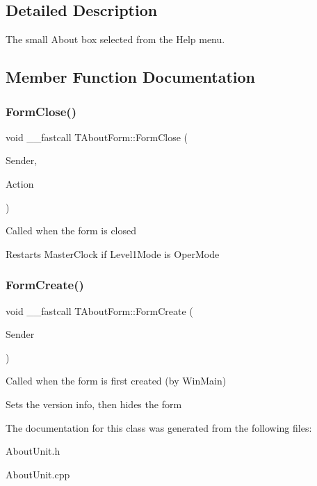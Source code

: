 \subsection{Detailed Description}
The small \textquotesingle{}About\textquotesingle{} box selected from the Help menu. 

\subsection{Member Function Documentation}
\mbox{\label{class_t_about_form_acddaba886282fa0cb6aa0ee77520fb05}} 
\subsubsection{\texorpdfstring{Form\+Close()}{FormClose()}}
{\footnotesize\ttfamily void \+\_\+\+\_\+fastcall T\+About\+Form\+::\+Form\+Close (\begin{DoxyParamCaption}\item[{T\+Object $\ast$}]{Sender,  }\item[{T\+Close\+Action \&}]{Action }\end{DoxyParamCaption})}

Called when the form is closed

Restarts Master\+Clock if Level1\+Mode is Oper\+Mode \mbox{\label{class_t_about_form_ad2cb3d318c91018ed8986c8315ccd52b}} 
\subsubsection{\texorpdfstring{Form\+Create()}{FormCreate()}}
{\footnotesize\ttfamily void \+\_\+\+\_\+fastcall T\+About\+Form\+::\+Form\+Create (\begin{DoxyParamCaption}\item[{T\+Object $\ast$}]{Sender }\end{DoxyParamCaption})}

Called when the form is first created (by Win\+Main)

Sets the version info, then hides the form 

The documentation for this class was generated from the following files\+:\begin{DoxyCompactItemize}
\item 
About\+Unit.\+h\item 
About\+Unit.\+cpp\end{DoxyCompactItemize}
